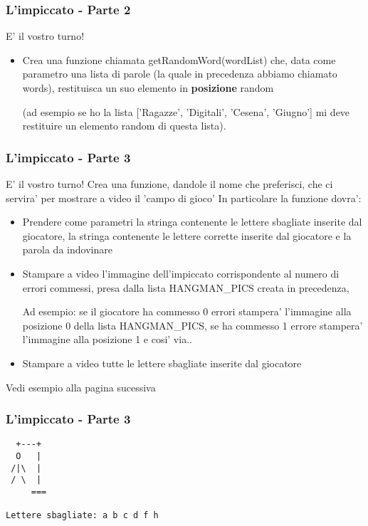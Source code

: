\begin{frame}[fragile]
\frametitle{L'impiccato - Parte 2}

\begin{block}{E' il vostro turno!}

    \begin{itemize}
        \item Crea una funzione chiamata getRandomWord(wordList) che, data come parametro una lista di parole (la quale in precedenza abbiamo chiamato words), restituisca un suo elemento in \textbf{posizione} random
        
        (ad esempio se ho la lista ['Ragazze', 'Digitali', 'Cesena', 'Giugno'] mi deve restituire un elemento random di questa lista).
    \end{itemize}
\end{block}
\end{frame}

\begin{frame}[fragile]
\frametitle{L'impiccato - Parte 3}

\begin{block}{E' il vostro turno!}
Crea una funzione, dandole il nome che preferisci, che ci servira' per mostrare a video il 'campo di gioco'
In particolare la funzione dovra':
    \begin{itemize}
        \item Prendere come parametri la stringa contenente le lettere sbagliate inserite dal giocatore, la stringa contenente le lettere corrette inserite dal giocatore e la parola da indovinare
        \item Stampare a video l'immagine dell'impiccato corrispondente al numero di errori commessi, presa dalla lista HANGMAN\_PICS creata in precedenza, 
        
        Ad esempio: se il giocatore ha commesso 0 errori stampera' l'immagine alla posizione 0 della lista HANGMAN\_PICS, se ha commesso 1 errore stampera' l'immagine alla posizione 1 e cosi' via..
        \item Stampare a video tutte le lettere sbagliate inserite dal giocatore
    \end{itemize}
\end{block}

Vedi esempio alla pagina sucessiva
\end{frame}

\begin{frame}[fragile]
\frametitle{L'impiccato - Parte 3}

\begin{lstlisting}
  +---+
  O   |
 /|\  |
 / \  |
     ===

Lettere sbagliate: a b c d f h 
\end{lstlisting}

\end{frame}

